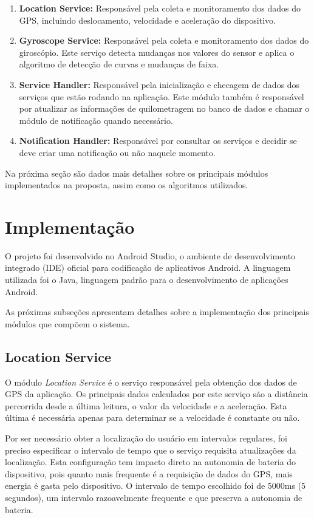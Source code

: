 \begin{enumerate}
  \item \textbf{Location Service:} Responsável pela coleta e monitoramento dos dados do GPS, incluindo deslocamento, velocidade e
  aceleração do dispositivo.
  \item \textbf{Gyroscope Service:} Responsável pela coleta e monitoramento dos dados do giroscópio. Este serviço detecta mudanças
  nos valores do sensor e aplica o algoritmo de detecção de curvas e mudanças de faixa.
  \item \textbf{Service Handler:} Responsável pela inicialização e checagem de dados dos serviços
  que estão rodando na aplicação. Este módulo também é responsável por atualizar as informações
  de quilometragem no banco de dados e chamar o módulo de notificação quando necessário.
  \item \textbf{Notification Handler:} Responsável por consultar os serviços e decidir se deve criar uma notificação ou não naquele
  momento.
\end{enumerate}

Na próxima seção são dados mais detalhes sobre os principais módulos implementados na proposta, assim como os algoritmos utilizados.

\section{Implementação}
\label{sec-implementacao}

O projeto foi desenvolvido no Android Studio, o ambiente de desenvolvimento integrado (IDE) oficial para
codificação de aplicativos Android. A linguagem utilizada foi o Java, linguagem padrão para o desenvolvimento
de aplicações Android.

As próximas subseções apresentam detalhes sobre a implementação dos principais módulos que compõem o sistema.

\subsection{Location Service}
\label{location-service}

O módulo \textit{Location Service} é o serviço responsável pela obtenção dos dados de GPS da aplicação. Os principais dados calculados
por este serviço são a distância percorrida desde a última leitura, o valor da velocidade e a aceleração. Esta última é necessária
apenas para determinar se a velocidade é constante ou não.

Por ser necessário obter a localização do usuário em intervalos regulares, foi preciso especificar o intervalo de tempo que o
serviço requisita atualizações da localização. Esta configuração tem impacto direto na autonomia de bateria do dispositivo,
pois quanto mais frequente é a requisição de dados do GPS, mais energia é gasta pelo dispositivo. O intervalo de tempo escolhido
foi de 5000ms (5 segundos), um intervalo razoavelmente frequente e que preserva a autonomia de bateria.

